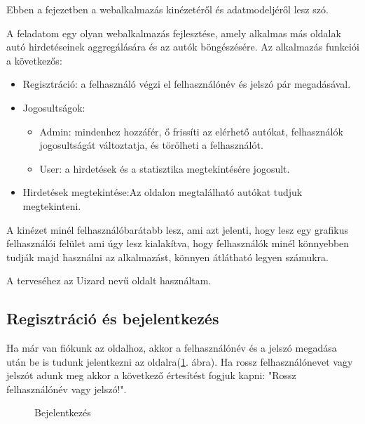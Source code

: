 Ebben a fejezetben a webalkalmazás kinézetéről és adatmodeljéről lesz szó.



A feladatom egy olyan webalkalmazás fejlesztése, amely alkalmas más oldalak autó hirdetéseinek aggregálására és az autók böngészésére. Az alkalmazás funkciói a következős:

\begin{itemize}
\item Regisztráció: a felhasználó végzi el felhasználónév és jelszó pár megadásával.
\item Jogosultságok:
	\begin{itemize}
	\item Admin: mindenhez hozzáfér, ő frissíti az elérhető autókat, felhasználók jogosultságát változtatja, és törölheti a felhasználót.
	\item User: a hirdetések és a statisztika megtekintésére jogosult.
	\end{itemize}
\item Hirdetések megtekintése:Az oldalon megtalálható autókat tudjuk megtekinteni.
\end{itemize}


A kinézet minél felhasználóbarátabb lesz, ami azt jelenti, hogy lesz egy grafikus felhasználói felület ami úgy lesz kialakítva, hogy felhasználók minél könnyebben tudják majd használni az alkalmazást, könnyen átlátható legyen számukra.

A terveséhez az Uizard \cite{uizard} nevű oldalt használtam.

\subsection{Regisztráció és bejelentkezés}

Ha már van fiókunk az oldalhoz, akkor a felhasználónév és a jelszó megadása után be is tudunk jelentkezni az oldalra(\ref{fig:Bejelentkezés}. ábra). Ha rossz felhasználónevet vagy jelszót adunk meg akkor a következő értesítést fogjuk kapni: "Rossz felhasználónév vagy jelszó!".

\newpage

\begin{figure}[h]
\centering
{}
\caption{Bejelentkezés}
\label{fig:Bejelentkezés}
\end{figure}


